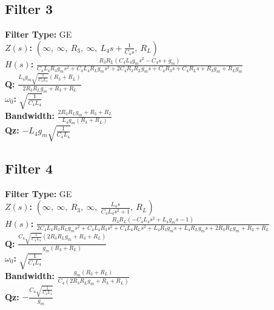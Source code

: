 \documentclass{article}
\begin{document}
\subsection*{Filter 3}
\textbf{Filter Type:} GE \\ 
\textbf{$Z(s)$:} $\left( \infty, \  \infty, \  R_{3}, \  \infty, \  L_{4} s + \frac{1}{C_{4} s}, \  R_{L}\right)$ \\ 
\textbf{$H(s)$:} $\frac{R_{3} R_{L} \left(C_{4} L_{4} g_{m} s^{2} - C_{4} s + g_{m}\right)}{C_{4} L_{4} R_{3} g_{m} s^{2} + C_{4} L_{4} R_{L} g_{m} s^{2} + 2 C_{4} R_{3} R_{L} g_{m} s + C_{4} R_{3} s + C_{4} R_{L} s + R_{3} g_{m} + R_{L} g_{m}}$ \\ 
\textbf{Q:} $\frac{L_{4} g_{m} \sqrt{\frac{1}{C_{4} L_{4}}} \left(R_{3} + R_{L}\right)}{2 R_{3} R_{L} g_{m} + R_{3} + R_{L}}$ \\ 
\textbf{$\omega_0$:} $\sqrt{\frac{1}{C_{4} L_{4}}}$ \\ 
\textbf{Bandwidth:} $\frac{2 R_{3} R_{L} g_{m} + R_{3} + R_{L}}{L_{4} g_{m} \left(R_{3} + R_{L}\right)}$ \\ 
\textbf{Qz:} $- L_{4} g_{m} \sqrt{\frac{1}{C_{4} L_{4}}}$ \\ 
\subsection*{Filter 4}
\textbf{Filter Type:} GE \\ 
\textbf{$Z(s)$:} $\left( \infty, \  \infty, \  R_{3}, \  \infty, \  \frac{L_{4} s}{C_{4} L_{4} s^{2} + 1}, \  R_{L}\right)$ \\ 
\textbf{$H(s)$:} $\frac{R_{3} R_{L} \left(- C_{4} L_{4} s^{2} + L_{4} g_{m} s - 1\right)}{2 C_{4} L_{4} R_{3} R_{L} g_{m} s^{2} + C_{4} L_{4} R_{3} s^{2} + C_{4} L_{4} R_{L} s^{2} + L_{4} R_{3} g_{m} s + L_{4} R_{L} g_{m} s + 2 R_{3} R_{L} g_{m} + R_{3} + R_{L}}$ \\ 
\textbf{Q:} $\frac{C_{4} \sqrt{\frac{1}{C_{4} L_{4}}} \left(2 R_{3} R_{L} g_{m} + R_{3} + R_{L}\right)}{g_{m} \left(R_{3} + R_{L}\right)}$ \\ 
\textbf{$\omega_0$:} $\sqrt{\frac{1}{C_{4} L_{4}}}$ \\ 
\textbf{Bandwidth:} $\frac{g_{m} \left(R_{3} + R_{L}\right)}{C_{4} \left(2 R_{3} R_{L} g_{m} + R_{3} + R_{L}\right)}$ \\ 
\textbf{Qz:} $- \frac{C_{4} \sqrt{\frac{1}{C_{4} L_{4}}}}{g_{m}}$ \\ 
\end{document}
